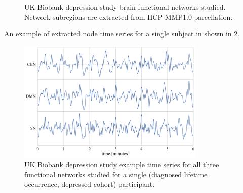 \begin{figure}[t]
  \centering
  \caption{
    UK Biobank depression study brain functional networks studied.
    Network subregions are extracted from HCP-MMP1.0 parcellation.
  }
  \label{fig:ukb-brain-functional-networks}
\end{figure}




An example of extracted node time series for a single subject in shown in \cref{fig:ukb-fn-example-time-series}.


\begin{figure}[ht]
  \centering
  \includegraphics[width=0.8\textwidth]{fig/ukbiobank/node_timeseries/diagnosed_lifetime_occurrence/depressed/time_series_functional_networks_of_interest}
  \caption{
    UK Biobank depression study example time series for all three functional networks studied for a single (diagnosed lifetime occurrence, depressed cohort) participant.
  }
  \label{fig:ukb-fn-example-time-series}
\end{figure}


